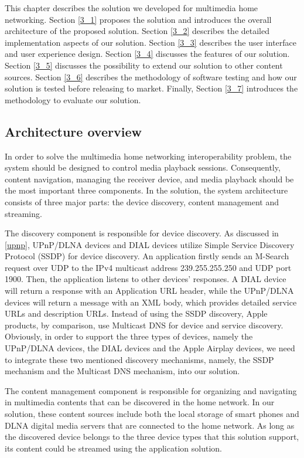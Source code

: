 This chapter describes the solution we developed for multimedia home networking.
Section \ref{3_1} proposes the solution and introduces the overall architecture
of the proposed solution. Section \ref{3_2} describes the detailed
implementation aspects of our solution. Section \ref{3_3} describes the user
interface and user experience design. Section \ref{3_4} discusses the features
of our solution. Section \ref{3_5} discusses the possibility to extend our
solution to other content sources. Section \ref{3_6} describes the methodology
of software testing and how our solution is tested before releasing to market.
Finally, Section \ref{3_7} introduces the methodology to evaluate our solution.

\subsection{Architecture overview\label{3_1}}
In order to solve the multimedia home networking interoperability problem, the
system should be designed to control media playback sessions. Consequently,
content navigation, managing the receiver device, and media playback should be
the most important three components. In the solution, the system architecture
consists of three major parts: the device discovery, content management and streaming.

The discovery component is responsible for device discovery. As discussed
in \ref{upnp}, UPnP/DLNA devices and DIAL devices utilize Simple Service Discovery
Protocol (SSDP) for device discovery. An application firstly sends an M-Search
request over UDP to the IPv4 multicast address 239.255.255.250 and UDP port
1900. Then, the application listens to other devices' responses. A DIAL device
will return a response with an Application URL header, while the UPnP/DLNA
devices will return a message with an XML body, which provides detailed service
URLs and description URLs. Instead of using the SSDP discovery, Apple products,
by comparison, use Multicast DNS for device and service discovery. Obviously,
in order to support the three types of devices, namely the UPnP/DLNA devices,
the DIAL devices and the Apple Airplay devices, we need to integrate these two
mentioned discovery mechanisms, namely, the SSDP mechanism and the Multicast
DNS mechanism, into our solution.

The content management component is responsible for organizing and navigating
in multimedia contents that can be discovered in the home network. In our
solution, these content sources include both the local storage of smart phones
and DLNA digital media servers that are connected to the home network. As long
as the discovered device belongs to the three device types that this solution
support, its content could be streamed using the application solution.

